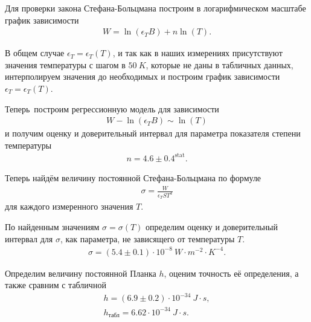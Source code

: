 \begin{enumerate}
\begin{figure}[h]
\end{figure}

Для проверки закона Стефана-Больцмана построим в логарифмическом масштабе график зависимости 
\begin{gather*}
W = \ln(\epsilon_T B) + n\ln(T).
\end{gather*}

\begin{figure}[h]
\end{figure}

В общем случае $\epsilon_T = \epsilon_T(T)$, и так как в наших измерениях присутствуют значения температуры с шагом в $50~K$, которые не даны в табличных данных, интерполируем значения до необходимых и построим график зависимости $\epsilon_T = \epsilon_T(T)$.

\begin{figure}[h]
\end{figure}

Теперь построим регрессионную модель для зависимости 
\begin{gather*}
W - \ln(\epsilon_T B) \sim \ln(T)
\end{gather*}
и получим оценку и доверительный интервал для параметра показателя степени температуры
\begin{gather*}
n = 4.6 \pm 0.4^{\text{stat}}.
\end{gather*}

Теперь найдём величину постоянной Стефана-Больцмана по формуле
\begin{gather*}
\sigma = \frac{W}{\epsilon_T S T^4}
\end{gather*}
для каждого измеренного значения $T$.

\begin{figure}[h]
\end{figure}

По найденным значениям $\sigma = \sigma(T)$ определим оценку и доверительный интервал для $\sigma$, как параметра, не зависящего от температуры $T$.
\begin{gather*}
\sigma = (5.4 \pm 0.1) \cdot 10^{-8}~W \cdot m^{-2} \cdot K^{-4}.
\end{gather*}

Определим величину постоянной Планка $h$, оценим точность её определения, а также сравним с табличной
\begin{gather*}
h = (6.9 \pm 0.2) \cdot 10^{-34}~J \cdot s,\\
h_{\text{табл}} = 6.62 \cdot 10^{-34}~J \cdot s.
\end{gather*}


\end{enumerate}
